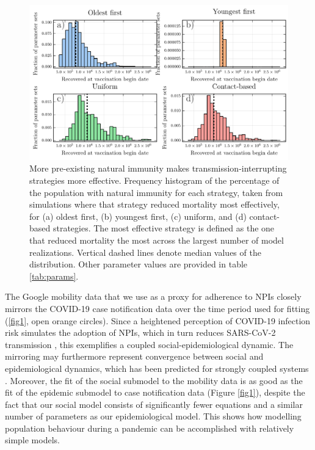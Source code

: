 \begin{figure}
  \includegraphics[width=\textwidth]{chapter_1/histograms.pdf}  
\caption[More pre-existing natural immunity makes transmission-interrupting strategies more effective.]{More pre-existing natural immunity makes transmission-interrupting strategies more effective. Frequency histogram of the percentage of the population with natural immunity for each strategy, taken from simulations where that strategy reduced mortality most effectively, for (a) oldest first, (b) youngest first, (c) uniform, and (d) contact-based strategies. The most effective strategy is defined as the one that reduced mortality the most across the largest number of model realizations. Vertical dashed lines denote median values of the distribution. Other parameter values are provided in table \ref{tab:params}.}
\label{fig6}
\end{figure}
The Google mobility data that we use as a proxy for adherence to NPIs closely mirrors the COVID-19 case notification data over the time period used for fitting (\ref{fig1}, open orange circles).  Since a heightened perception of COVID-19 infection risk simulates the adoption of NPIs, which in turn reduces SARS-CoV-2 transmission \cite{anderson2020estimating,peak2020individual}, this exemplifies a coupled  social-epidemiological dynamic.  The mirroring may furthermore represent convergence between social and epidemiological dynamics, which has been predicted for strongly coupled systems \cite{sigdel2019convergence}. Moreover, the fit of the social submodel to the mobility data is as good as the fit of the epidemic submodel to case notification data (Figure \ref{fig1}), despite the fact that our social model consists of significantly fewer equations and a similar number of parameters as our epidemiological model. This shows how modelling population behaviour during a pandemic can be accomplished with relatively simple models. 

